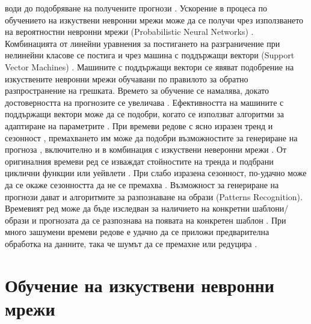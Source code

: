 води до подобряване на получените прогнози \cite{Cao-02}. Ускорение в процеса по обучението на изкуствени невронни мрежи може да се получи чрез използването на вероятностни невронни мрежи (Probabilistic Neural Networks) \cite{Khashei-02}. Комбинацията от линейни уравнения за постигането на разграничение при нелинейни класове се постига и чрез машина с поддържащи вектори (Support Vector Machines) \cite{Kyoung-jae-01}. Машините с поддържащи вектори се явяват подобрение на изкуствените невронни мрежи обучавани по правилото за обратно разпространение на грешката. Времето за обучение се намалява, докато достоверността на прогнозите се увеличава \cite{Tay-01}. Ефективността на машините с поддържащи вектори може да се подобри, когато се използват алгоритми за адаптиране на параметрите \cite{Cao-01}. При времеви редове с ясно изразен тренд и сезонност \cite{Zhang-04}, премахването им може да подобри възможностите за генериране на прогноза \cite{Zhang-02}, включително и в комбинация с изкуствени неверонни мрежи \cite{Jain-01}. От оригиналния времеви ред се изваждат стойностите на тренда и подбрани циклични функции \cite{Nelson-01} или уейвлети \cite{Joo-01}. При слабо изразена сезонност, по-удачно може да се окаже сезонността да не се премахва \cite{Hamzacebi-01}. Възможност за генериране на прогнози дават и алгоритмите за разпознаване на образи (Patterns Recognition). Времевият ред може да бъде изследван за наличието на конкретни шаблони/образи и прогнозата да се разпознава на появата на конкретен шаблон \cite{Singh-01}. При много зашумени времеви редове е удачно да се приложи предварителна обработка на данните, така че шумът да се премахне или редуцира \cite{Lu-01}.

\section{Обучение на изкуствени невронни мрежи}

